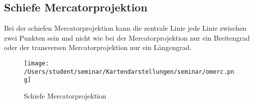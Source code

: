 \subsection{Schiefe Mercatorprojektion}
\label{sec:schiefmerc}
Bei der schiefen Mercatorprojektion kann die zentrale Linie jede Linie zwischen zwei Punkten sein und nicht wie bei der Mercatorprojektion nur ein Breitengrad oder der transversen Mercatorprojektion nur ein Längengrad.\\
\begin{figure}[hbtp]
\centering
\texttt{[image: /Users/student/seminar/Kartendarstellungen/seminar/omerc.png]}
\caption{Schiefe Mercatorprojektion}
\end{figure}
\newpage 
